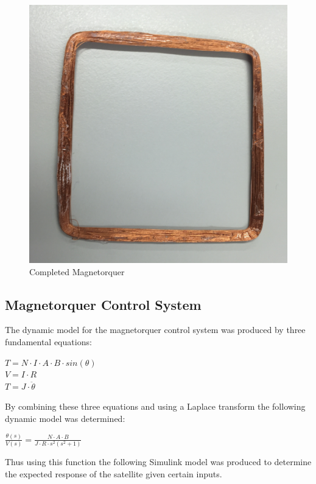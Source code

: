 \vspace{-6mm}
\begin{center}
\begin{figure}[H]
\caption{Completed Magnetorquer}
\vspace{-4mm}
\centering
\includegraphics[scale = 0.4]{Magnetorquer.png}
\end{figure}
\end{center}
\vspace{-5mm}

\subsection{Magnetorquer Control System}
The dynamic model for the magnetorquer control system was produced by three fundamental equations:
\begin{center}
$T = N \cdot I \cdot A \cdot B \cdot sin(\theta)$ \vspace{2mm} \\
$V = I \cdot R$\vspace{2mm}\\
$T = J \cdot \ddot{\theta}$\\
\end{center}
By combining these three equations and using a Laplace transform the following dynamic model was determined:
\begin{center}
$\frac{\theta(s)}{V(s)} = \frac{N \cdot A \cdot B}{J \cdot R \cdot s^2 (s^2 + 1)}$
\end{center}
Thus using this function the following Simulink model was produced to determine the expected response of the satellite given certain inputs.

